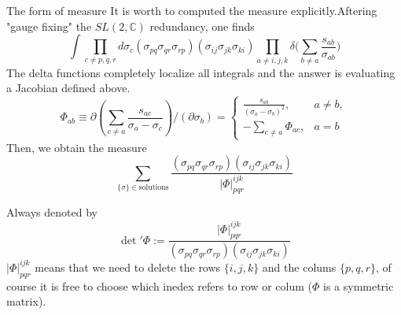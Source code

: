 \documentclass{beamer}
\begin{document}
\begin{frame}{The form of measure}
    It is worth to computed the measure explicitly.Aftering "gauge fixing" the $SL(2,\mathbb{C})$ redundancy, one finds 
    \begin{equation*}
        \int\prod_{c\neq p,q,r}d\sigma_c(\sigma_{pq}\sigma_{qr}\sigma_{rp})(\sigma_{ij}\sigma_{jk}\sigma_{ki})\prod_{a\neq i,j,k}\delta\biggl(\sum_{b\neq a}\frac{s_{ab}}{\sigma_{ab}}\biggr)
    \end{equation*}
    The delta functions completely localize all integrals and the answer is evaluating a Jacobian defined above.
    \begin{equation*}
            \Phi_{ab}\equiv\partial\left(\sum_{c\neq a}\frac{s_{ac}}{\sigma_a-\sigma_c}\right)/\left(\partial\sigma_b\right)=\begin{cases}\frac{s_{ab}}{(\sigma_a-\sigma_b)^2},&a\neq b,\\-\sum_{c\neq a}\Phi_{ac}, &a=b\end{cases}
    \end{equation*}
    Then, we obtain the measure
    \begin{equation*}
            \boxed{
            \sum_{\{\sigma\}\in\mathrm{solutions}}\frac{(\sigma_{pq}\sigma_{qr}\sigma_{rp})(\sigma_{ij}\sigma_{jk}\sigma_{ki})}{|\Phi|_{pqr}^{ijk}}}
    \end{equation*}
\end{frame}
\begin{frame}
    Always denoted by 
    \begin{equation*}
        \boxed{
        \det{'}\Phi:=\frac{|\Phi|_{pqr}^{ijk}}{(\sigma_{pq}\sigma_{qr}\sigma_{rp})(\sigma_{ij}\sigma_{jk}\sigma_{ki})}}
    \end{equation*}
    $|\Phi|_{pqr}^{ijk}$ means that we need to delete the rows $\{i,j,k\}$ and the colums $\{p,q,r\}$, of course it is free to choose which inedex refers
    to row or colum ($\Phi$ is a symmetric matrix).
\end{frame}
\end{document}
